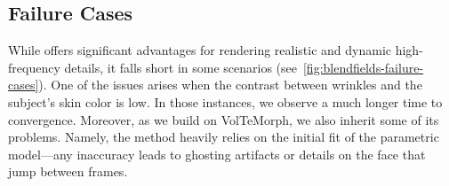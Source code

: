   \subsection{Failure Cases}
    \label{subsec:blendfields-failures}
    
    While \blendfields offers significant advantages for rendering realistic
    and dynamic high-frequency details, it falls short in some scenarios
    (see~\cref{fig:blendfields-failure-cases}).
    One of the issues arises when the contrast between wrinkles and the
    subject's skin color is low.
    In those instances, we observe a much longer time to convergence.
    Moreover, as we build \blendfields on VolTeMorph, we also inherit some of
    its problems.
    Namely, the method heavily relies on the initial fit of the parametric
    model---any inaccuracy leads to ghosting artifacts or details on the face
    that jump between frames.
